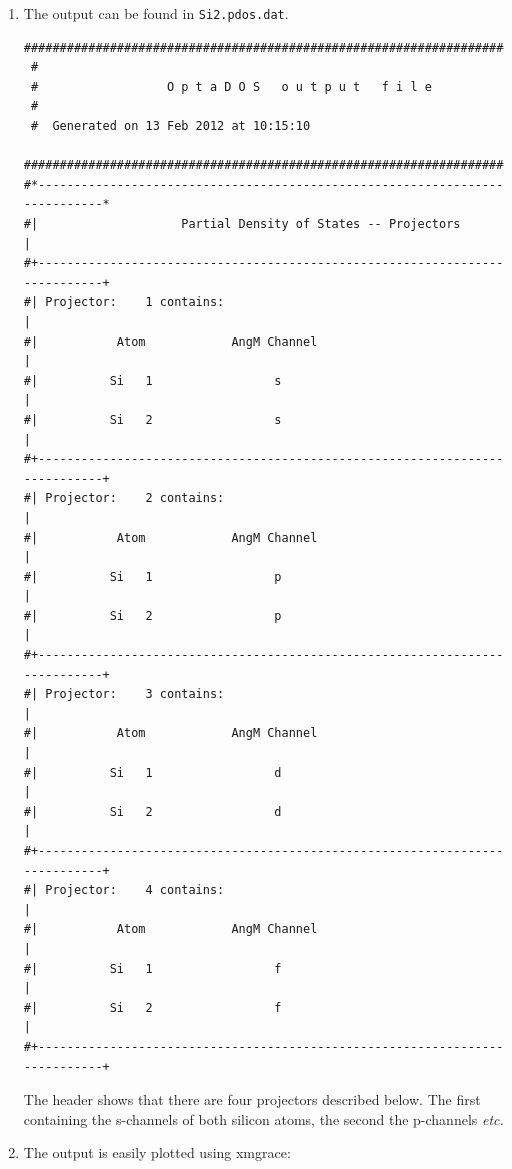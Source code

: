 \documentclass[a4paper,11pt,twoside]{book}
\begin{document}
{\begin{enumerate}
\item  The output can be found in {\tt Si2.pdos.dat}.
\begin{verbatim}
##############################################################################
 #
 #                  O p t a D O S   o u t p u t   f i l e
 #
 #  Generated on 13 Feb 2012 at 10:15:10
 ##############################################################################
#*----------------------------------------------------------------------------*
#|                    Partial Density of States -- Projectors                 |
#+----------------------------------------------------------------------------+
#| Projector:    1 contains:                                                  |
#|           Atom            AngM Channel                                     |
#|          Si   1                 s                                          |
#|          Si   2                 s                                          |
#+----------------------------------------------------------------------------+
#| Projector:    2 contains:                                                  |
#|           Atom            AngM Channel                                     |
#|          Si   1                 p                                          |
#|          Si   2                 p                                          |
#+----------------------------------------------------------------------------+
#| Projector:    3 contains:                                                  |
#|           Atom            AngM Channel                                     |
#|          Si   1                 d                                          |
#|          Si   2                 d                                          |
#+----------------------------------------------------------------------------+
#| Projector:    4 contains:                                                  |
#|           Atom            AngM Channel                                     |
#|          Si   1                 f                                          |
#|          Si   2                 f                                          |
#+----------------------------------------------------------------------------+
\end{verbatim}
The header shows that there are four projectors described below. The first containing the s-channels of both silicon atoms, the second the p-channels \emph{etc.}

\item The output is easily plotted using xmgrace:


\end{enumerate}}
\end{document}
